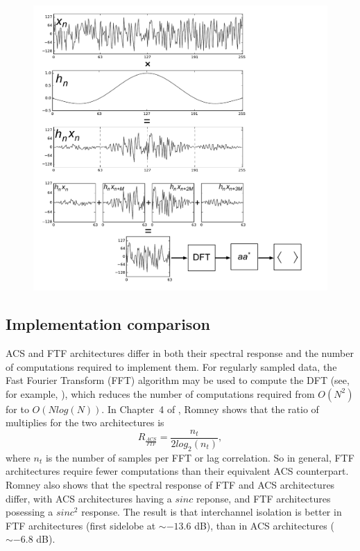 \documentclass{ws-rv961x669}
\begin{document}
\begin{figure}
 \centering
 \includegraphics[width=\textwidth]{./figures/pfb_chart}
 \label{fig:pfb_chart}
 \caption{}
\end{figure}



\subsection{Implementation comparison}\label{sub:comparison}

ACS and FTF architectures differ in both their spectral response and the number of computations required to implement them. For regularly
sampled data, the Fast Fourier Transform (FFT) algorithm may be used to compute the DFT (see, for example, \citep{BookBrighamFFT}),
which reduces the number of computations required from $O(N^{2})$ for to $O(Nlog(N))$. In Chapter~4 of \citep{Taylor1999}, Romney
shows that the ratio of multiplies for the two architectures is 
\begin{equation}
R_{\frac{ACS}{FTF}}=\frac{n_{t}}{\mbox{2}log_{2}(n_{t})},
\end{equation}
where $n_{t}$ is the number of samples per FFT or lag correlation. So in general, FTF architectures require fewer computations than their equivalent ACS counterpart. Romney also shows that the spectral response of FTF and ACS architectures differ, with ACS architectures having a $sinc$ reponse, and FTF architectures posessing a $sinc^{2}$ response. The result is that interchannel isolation is better in FTF architectures (first sidelobe at $\sim-\mbox{13.6}$ dB), than in ACS architectures ($\sim-\mbox{6.8}$ dB). 
\end{document}
